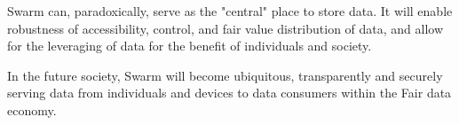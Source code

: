 Swarm can, paradoxically, serve as the "central" place to store data. It will enable robustness of accessibility, control, and fair value distribution of data, and allow for the leveraging of data for the benefit of individuals and society.

In the future society, Swarm will become ubiquitous, transparently and securely serving data from individuals and devices to data consumers within the Fair data economy.

